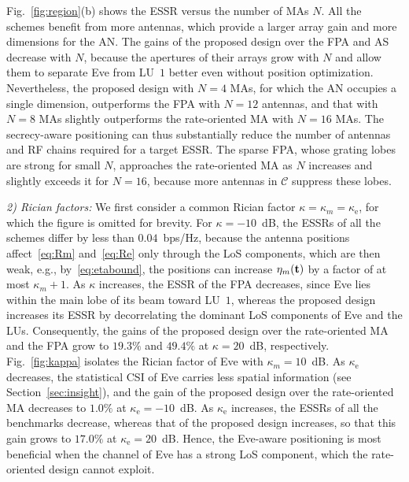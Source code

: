 \documentclass[journal]{IEEEtran}
\newcommand{\rev}[1]{{\color{red}#1}}
\newcommand{\rev}[1]{#1}
\begin{document}
Fig.~\ref{fig:region}(b) shows the ESSR versus the number of MAs $N$. All the schemes benefit from more antennas, which provide a larger array gain and more dimensions for the AN. The gains of the proposed design over the FPA and AS decrease with $N$, because the apertures of their arrays grow with $N$ and allow them to separate Eve from LU~$1$ better even without position optimization. Nevertheless, the proposed design with $N=4$ MAs, for which the AN occupies a single dimension, outperforms the FPA with $N=12$ antennas, and that with $N=8$ MAs slightly outperforms the rate-oriented MA with $N=16$ MAs. The secrecy-aware positioning can thus substantially reduce the number of antennas and RF chains required for a target ESSR. The sparse FPA, whose grating lobes are strong for small $N$, approaches the rate-oriented MA as $N$ increases and slightly exceeds it for $N=16$, because more antennas in $\mathcal C$ suppress these lobes.

\rev{\textit{2) Rician factors:} We first consider a common Rician factor $\kappa=\kappa_m=\kappa_{\mathrm e}$, for which the figure is omitted for brevity. For $\kappa=-10$~dB, the ESSRs of all the schemes differ by less than $0.04$~bps/Hz, because the antenna positions affect~\eqref{eq:Rm} and~\eqref{eq:Re} only through the LoS components, which are then weak, e.g., by~\eqref{eq:etabound}, the positions can increase $\eta_m(\mathbf{t})$ by a factor of at most $\kappa_m+1$. As $\kappa$ increases, the ESSR of the FPA decreases, since Eve lies within the main lobe of its beam toward LU~$1$, whereas the proposed design increases its ESSR by decorrelating the dominant LoS components of Eve and the LUs. Consequently, the gains of the proposed design over the rate-oriented MA and the FPA grow to $19.3\%$ and $49.4\%$ at $\kappa=20$~dB, respectively. Fig.~\ref{fig:kappa} isolates the Rician factor of Eve with $\kappa_m=10$~dB. As $\kappa_{\mathrm e}$ decreases, the statistical CSI of Eve carries less spatial information (see Section~\ref{sec:insight}), and the gain of the proposed design over the rate-oriented MA decreases to $1.0\%$ at $\kappa_{\mathrm e}=-10$~dB. As $\kappa_{\mathrm e}$ increases, the ESSRs of all the benchmarks decrease, whereas that of the proposed design increases, so that this gain grows to $17.0\%$ at $\kappa_{\mathrm e}=20$~dB. Hence, the Eve-aware positioning is most beneficial when the channel of Eve has a strong LoS component, which the rate-oriented design cannot exploit.}
\end{document}
